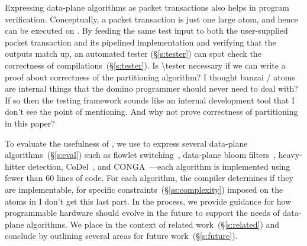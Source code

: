 
Expressing data-plane algorithms as packet transactions also helps in program
verification.  Conceptually, a packet transaction is just one large atom, and
hence can be executed on \absmachine.  By feeding the same test input to both
the user-supplied packet transaction and its pipelined implementation and
verifying that the outputs match up, an automated tester (\S\ref{s:tester}) can
spot check the correctness of compilations~(\S\ref{s:tester}).
\ac{Is \tester necessary if we can write
a proof about correctness of the partitioning algorithm?} 
\ac{I thought banzai / atoms are internal things that the 
domino programmer should never need to deal with? If so then the 
testing framework sounds like an internal
development tool that I don't see the point of mentioning. And why not
prove correctness of partitioning in this paper?}


To evaluate the usefulness of \pktlanguage, we use \pktlanguage to express
several data-plane algorithms~(\S\ref{s:eval}) such as flowlet
switching~\cite{flowlets}, data-plane bloom filters~\cite{bloom}, heavy-hitter
detection, CoDel~\cite{codel}, and CONGA~\cite{conga}---each algorithm is
implemented using fewer than 60 lines
of \pktlanguage code. For each algorithm, the \pktlanguage compiler determines
if they are implementable, for specific constraints~(\S\ref{ss:complexity})
imposed on the atoms in \absmachine \ac{I don't get this last part}. 
In the process, we provide guidance for
how programmable hardware should evolve in the future to support the needs of
data-plane algorithms.  We place \pktlanguage in the context of related
work~(\S\ref{s:related}) and conclude by outlining several areas for future
work~(\S\ref{s:future}).
